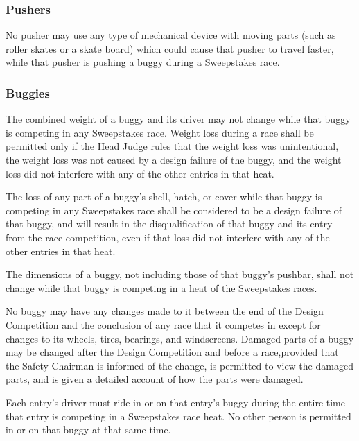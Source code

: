 \subsubsection{Pushers}

No pusher may use any type of mechanical device with moving parts (such as roller skates or a skate board) which could cause that pusher to travel faster, while that pusher is pushing a buggy during a Sweepstakes race.

\subsubsection{Buggies}

The combined weight of a buggy and its driver may not change while that buggy is competing in any Sweepstakes race. Weight loss during a race shall be permitted only if the Head Judge rules that the weight loss was unintentional, the weight loss was not caused by a design failure of the buggy, and the weight loss did not interfere with any of the other entries in that heat.

The loss of any part of a buggy's shell, hatch, or cover while that buggy is competing in any Sweepstakes race shall be considered to be a design failure of that buggy, and will result in the disqualification of that buggy and its entry from the race competition, even if that loss did not interfere with any of the other entries in that heat.

The dimensions of a buggy, not including those of that buggy's pushbar, shall not change while that buggy is competing in a heat of the Sweepstakes races.

No buggy may have any changes made to it between the end of the Design Competition and the conclusion of any race that it competes in except for changes to its wheels, tires, bearings, and windscreens. Damaged parts of a buggy may be changed after the Design Competition and before a race,provided that the Safety Chairman is informed of the change, is permitted to view the damaged parts, and is given a detailed account of how the parts were damaged.

Each entry's driver must ride in or on that entry's buggy during the entire time that entry is competing in a Sweepstakes race heat. No other person is permitted in or on that buggy at that same time.

